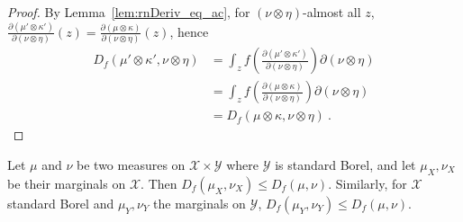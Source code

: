 \begin{proof}
By Lemma~\ref{lem:rnDeriv_eq_ac}, for $(\nu \otimes \eta)$-almost all $z$, $\frac{\partial(\mu' \otimes \kappa')}{\partial(\nu \otimes \eta)}(z) = \frac{\partial(\mu \otimes \kappa)}{\partial(\nu \otimes \eta)}(z)$, hence
\begin{align*}
D_f(\mu' \otimes \kappa', \nu \otimes \eta)
&= \int_z f\left(\frac{\partial(\mu' \otimes \kappa')}{\partial(\nu \otimes \eta)}\right) \partial(\nu \otimes \eta)
\\
&= \int_z f\left(\frac{\partial(\mu \otimes \kappa)}{\partial(\nu \otimes \eta)}\right) \partial(\nu \otimes \eta)
\\
&= D_f(\mu \otimes \kappa, \nu \otimes \eta)
\: .
\end{align*}

\end{proof}

\begin{theorem}[Marginals]
  \label{thm:fDiv_fst_le}
  Let $\mu$ and $\nu$ be two measures on $\mathcal X \times \mathcal Y$ where $\mathcal Y$ is standard Borel, and let $\mu_X, \nu_X$ be their marginals on $\mathcal X$.
  Then $D_f(\mu_X, \nu_X) \le D_f(\mu, \nu)$.
  Similarly, for $\mathcal X$ standard Borel and $\mu_Y, \nu_Y$ the marginals on $\mathcal Y$, $D_f(\mu_Y, \nu_Y) \le D_f(\mu, \nu)$.
\end{theorem}

